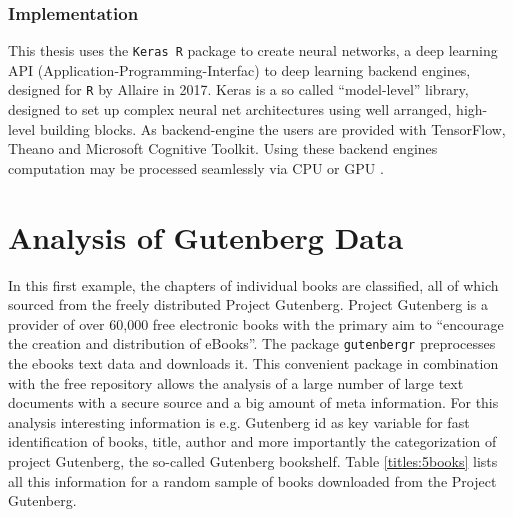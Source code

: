 \documentclass[11pt,a4paper]{article}
\begin{document}
\subsubsection{Implementation}
This thesis uses the \texttt{Keras R} package to create neural networks, a deep learning API (Application-Programming-Interfac) to deep learning backend engines, designed for \texttt{R} by Allaire in 2017. Keras is a so called “model-level” library, designed to set up complex neural net architectures using well arranged, high-level building blocks. As backend-engine the users are provided with TensorFlow, Theano and Microsoft Cognitive Toolkit. Using these backend engines computation may be processed seamlessly via CPU or GPU \cite{Chollet2018}.

\section{Analysis of Gutenberg Data}\label{sec:analysis}

In this first example, the chapters of individual books are classified, all of which sourced from the freely distributed Project Gutenberg. Project Gutenberg is a provider of over 60,000 free electronic books with the primary aim to “encourage the creation and distribution of eBooks”\cite{ProjectGutenberg}. The package \texttt{gutenbergr} \cite{gutenbergr} preprocesses the ebooks text data and downloads it. This convenient package in combination with the free repository allows the analysis of a large number of large text documents with a secure source and a big amount of meta information. For this analysis interesting information is e.g. Gutenberg id as key variable for fast identification of books, title, author and more importantly the categorization of project Gutenberg, the so-called Gutenberg bookshelf. Table \ref{titles:5books} lists all this information for a random sample of books downloaded from the Project Gutenberg.
\end{document}
